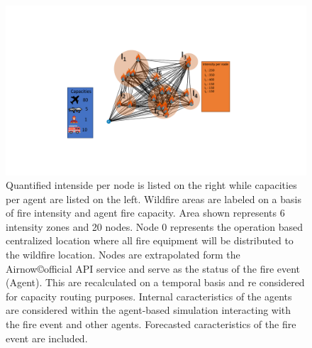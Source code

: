 \documentclass[preprint,review, 11pt,3p,authoryear]{elsarticle}
\newcommand{\rev}{\color{black}} %
\begin{document}

\begin{figure}[H]
\centering
\includegraphics[scale=0.65]{figs/Infograph.pdf}
\caption{Quantified intenside per node is listed on the right while capacities per agent are listed on the left. Wildfire areas are labeled on a basis of fire intensity and agent fire capacity. 
Area shown represents 6 intensity zones and 20 nodes. Node 0 represents the operation based centralized location where all fire equipment will be distributed to the wildfire location. Nodes are extrapolated form the Airnow\copyright official API service and serve as the status of the fire event (Agent). This are recalculated on a temporal basis and re considered for capacity routing purposes.
Internal caracteristics of the agents are considered within the agent-based simulation interacting with the fire event and other agents. Forecasted caracteristics of the fire event are included.}
\label{fig01}
\end{figure}
\end{document}
